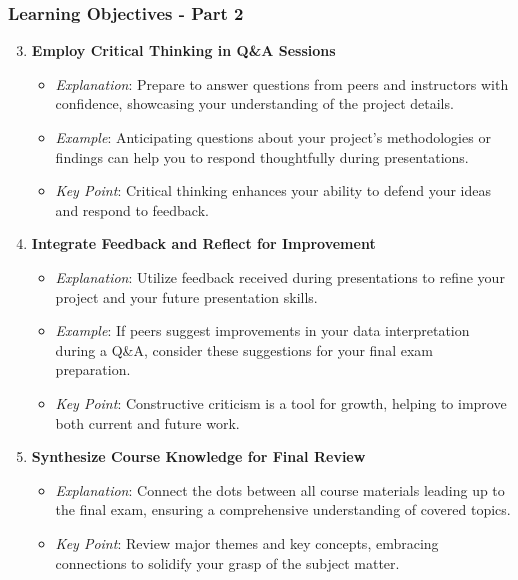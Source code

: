 \documentclass[aspectratio=169]{beamer}
\begin{document}
\begin{frame}[fragile]
    \frametitle{Learning Objectives - Part 2}
    \begin{enumerate}
        \setcounter{enumi}{2}
        \item \textbf{Employ Critical Thinking in Q\&A Sessions}
            \begin{itemize}
                \item \textit{Explanation}: Prepare to answer questions from peers and instructors with confidence, showcasing your understanding of the project details.
                \item \textit{Example}: Anticipating questions about your project’s methodologies or findings can help you to respond thoughtfully during presentations.
                \item \textit{Key Point}: Critical thinking enhances your ability to defend your ideas and respond to feedback.
            \end{itemize}

        \item \textbf{Integrate Feedback and Reflect for Improvement}
            \begin{itemize}
                \item \textit{Explanation}: Utilize feedback received during presentations to refine your project and your future presentation skills.
                \item \textit{Example}: If peers suggest improvements in your data interpretation during a Q\&A, consider these suggestions for your final exam preparation.
                \item \textit{Key Point}: Constructive criticism is a tool for growth, helping to improve both current and future work.
            \end{itemize}

        \item \textbf{Synthesize Course Knowledge for Final Review}
            \begin{itemize}
                \item \textit{Explanation}: Connect the dots between all course materials leading up to the final exam, ensuring a comprehensive understanding of covered topics.
                \item \textit{Key Point}: Review major themes and key concepts, embracing connections to solidify your grasp of the subject matter.
            \end{itemize}

    \end{enumerate}
\end{frame}
\end{document}
